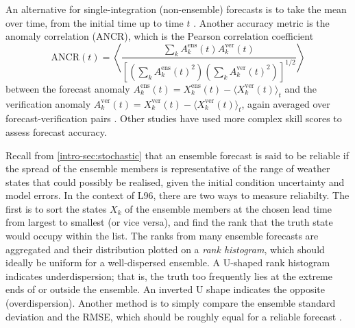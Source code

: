\documentclass[../main.tex]{subfiles}
\begin{document}
An alternative for single-integration (non-ensemble) forecasts is to take the
mean over time, from the initial time up to time $t$ \parencite{bhouri2023}.
Another accuracy metric is the anomaly correlation (ANCR), which is the Pearson
correlation coefficient
\begin{equation*}
    \mathrm{ANCR}(t) = \left\langle
        \frac{
            \sum_k A_k^\text{ens}(t) A_k^\text{ver}(t)
        }{
            \left[
                \left( \sum_k A_k^\text{ens}(t)^2 \right)
                \left( \sum_k A_k^\text{ver}(t)^2 \right)
            \right]^{1/2}
        }
    \right\rangle
\end{equation*}
between the forecast anomaly $A_k^\text{ens}(t) = X_k^\text{ens}(t) - \langle
X_k^\text{ver}(t) \rangle_t$ and the verification anomaly $A_k^\text{ver}(t) =
X_k^\text{ver}(t) - \langle X_k^\text{ver}(t) \rangle_t$, again averaged over
forecast-verification pairs \parencite{crommelin2008}. Other studies
\parencite{kwasniok2012,arnold2013} have used more complex skill scores to
assess forecast accuracy.

Recall from \cref{intro-sec:stochastic} that an ensemble forecast is said to be
reliable if the spread of the ensemble members is representative of the range
of weather states that could possibly be realised, given the initial condition
uncertainty and model errors. In the context of L96, there are two ways to
measure reliabilty. The first \parencite{wilks2005,crommelin2008,kwasniok2012}
is to sort the states $X_k$ of the ensemble members at the chosen lead time
from largest to smallest (or vice versa), and find the rank that the truth
state would occupy within the list. The ranks from many ensemble forecasts are
aggregated and their distribution plotted on a \emph{rank histogram}, which
should ideally be uniform for a well-dispersed ensemble. A U-shaped rank
histogram indicates underdispersion; that is, the truth too frequently lies at
the extreme ends of or outside the ensemble. An inverted U shape indicates the
opposite (overdispersion). Another method is to simply compare the ensemble
standard deviation and the RMSE, which should be roughly equal for a reliable
forecast \parencite{arnold2013,gagne2020}.
\end{document}
